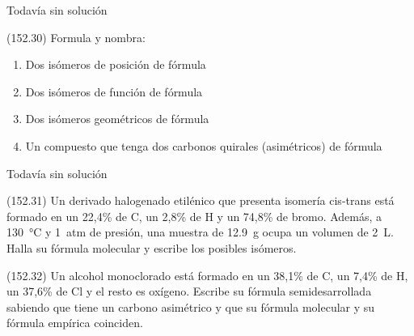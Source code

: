 \documentclass[10pt,a5paper,twoside]{article}
\begin{document}
  \begin{solution}[print=false]
    Todavía sin solución
  \end{solution}




  \begin{exercise}[
      tags    = {},
      topics  = {química, química orgánica, orgánica},
      source  = {FQ 1B MGH 2016, p152, e30},
    ]
    (152.30) Formula y nombra:
    \begin{enumerate}
      \item Dos isómeros de posición de fórmula 
      \item Dos isómeros de función de fórmula 
      \item Dos isómeros geométricos de fórmula 
      \item Un compuesto que tenga dos carbonos quirales (asimétricos) de fórmula 
    \end{enumerate}
  \end{exercise}

  \begin{solution}[print=false]
    Todavía sin solución
  \end{solution}




  \begin{exercise}[
      tags    = {},
      topics  = {química, química orgánica, orgánica},
      source  = {FQ 1B MGH 2016, p152, e31},
    ]
    (152.31) Un derivado halogenado etilénico que presenta isomería cis-trans está formado en un 22,4\% de C, un 2,8\% de H y un 74,8\% de bromo. Además, a \SI{130}{\celsius} y \SI{1}{atm} de presión, una muestra de \SI{12,9}{\gram} ocupa un volumen de \SI{2}{\liter}. Halla su fórmula molecular y escribe los posibles isómeros.
  \end{exercise}

  \begin{solution}
  \end{solution}




  \begin{exercise}[
      tags    = {},
      topics  = {química, química orgánica, orgánica},
      source  = {FQ 1B MGH 2016, p152, e32},
    ]
    (152.32) Un alcohol monoclorado está formado en un 38,1\% de C,
    un 7,4\% de H, un 37,6\% de Cl y el resto es oxígeno. Escribe
    su fórmula semidesarrollada sabiendo que tiene un carbono
    asimétrico y que su fórmula molecular y su fórmula empírica
    coinciden.
  \end{exercise}
\end{document}
